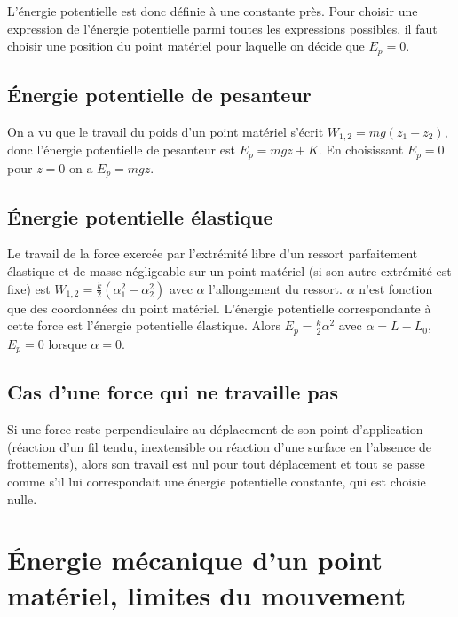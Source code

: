 L'énergie potentielle est donc définie à une constante près. Pour choisir une expression de l'énergie potentielle parmi toutes les expressions possibles, il faut choisir une position du point matériel pour laquelle on décide que \(E_p=0\).

\subsection{Énergie potentielle de pesanteur}
\label{chap4-subsec:NRJPotPes}

On a vu que le travail du poids d'un point matériel s'écrit \(W_{1, 2}=mg(z_1-z_2)\), donc l'énergie potentielle de pesanteur est \(E_p = mgz +K\). En choisissant \(E_p=0\) pour \(z=0\) on a \(E_p=mgz\).

\subsection{Énergie potentielle élastique}
\label{chap4-subsec:NRJPotElast}

Le travail de la force exercée par l'extrémité libre d'un ressort parfaitement élastique et de masse négligeable sur un point matériel (si son autre extrémité est fixe) est \(W_{1, 2} = \frac{k}{2}(\alpha_1^2-\alpha_2^2)\) avec \(\alpha\) l'allongement du ressort. \(\alpha\) n'est fonction que des coordonnées du point matériel. L'énergie potentielle correspondante à cette force est l'énergie potentielle élastique. Alors \(E_p = \frac{k}{2}\alpha^2\) avec \(\alpha=L-L_0\), \(E_p=0\) lorsque \(\alpha=0\).

\subsection{Cas d'une force qui ne travaille pas}
\label{chap4-subsec:casduneforcequinetravaillepas}

Si une force reste perpendiculaire au déplacement de son point d'application (réaction d'un fil tendu, inextensible ou réaction d'une surface en l'absence de frottements), alors son travail est nul pour tout déplacement et tout se passe comme s'il lui correspondait une énergie potentielle constante, qui est choisie nulle.

\section{Énergie mécanique d'un point matériel, limites du mouvement}
\label{chap4-sec:NRJmecanique}

